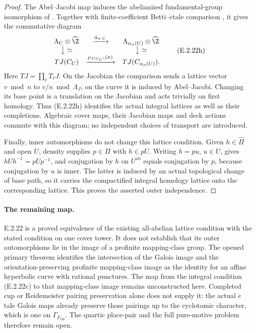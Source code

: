 \begin{proof}
The Abel--Jacobi map induces the abelianized fundamental-group
isomorphism of \cite[Proposition 9.1 and Corollary 9.6,
pp.30--32]{GenMilneJVs2021}. Together with finite-coefficient
Betti--\(\acute{e}\)tale comparison
\cite[Expos\'e XVI, Th\'eor\`eme 4.1]{GenSGA4}, it gives
the commutative diagram
\[
\begin{array}{ccc}
 \Lambda_U\otimes\widehat\Z
   &\xrightarrow{\bar\alpha_{\sigma,U}}&
 \Lambda_{\alpha_\sigma(U)}\otimes\widehat\Z\\
 \big\downarrow\simeq && \big\downarrow\simeq\\
 T J(C_U)&\xrightarrow{\rho_{J(C_U)}(\sigma)}&
 T J(C_{\alpha_\sigma(U)}).
\end{array}
 \tag{E.2.22h}
\]
Here \(TJ=\prod_\ell T_\ell J\). On the Jacobian the
comparison sends a lattice vector \(v\bmod n\) to
\(v/n\bmod\Lambda_J\); on the curve it is induced by
Abel--Jacobi. Changing its base point is a translation on
the Jacobian and acts trivially on first homology.
Thus (E.2.22h) identifies the actual integral lattices as
well as their completions. Algebraic cover maps, their
Jacobian maps and deck actions commute with this diagram;
no independent choices of transport are introduced.

Finally, inner automorphisms do not change this lattice
condition. Given \(h\in\widehat\Pi\) and open \(U\),
density supplies \(p\in\Pi\) with \(h\in pU\).
Writing \(h=pu\), \(u\in U\), gives
\(hUh^{-1}=pUp^{-1}\), and conjugation by \(h\) on
\(U^{\mathrm{ab}}\) equals conjugation by \(p\), because
conjugation by \(u\) is inner. The latter is induced by an
actual topological change of base path, so it carries the
compactified integral homology lattice onto the corresponding
lattice. This proves the asserted outer independence.
\end{proof}

\paragraph{The remaining map.}
E.2.22 is a proved equivalence of the existing all-abelian
lattice condition with the stated condition on one cover
tower. It does not establish that its outer automorphisms lie
in the image of a profinite mapping-class group.
The opened primary theorem
\cite[Theorem 1.1, p.2, proof p.3]{GenMatsumotoTamagawa1997}
identifies the intersection of the Galois image and the
orientation-preserving profinite mapping-class image as the
identity for an affine hyperbolic curve with rational
punctures. The map from the integral condition (E.2.22c) to
that mapping-class image remains unconstructed here.
Completed cup or Reidemeister pairing preservation alone
does not supply it: the actual \(\acute{e}\)tale Galois maps
already preserve those pairings up to the cyclotomic
character, which is one on \(\Gamma_{F_{\mathrm{cm}}}\).
The quartic place-pair and the full pure-motive problem
therefore remain open.

